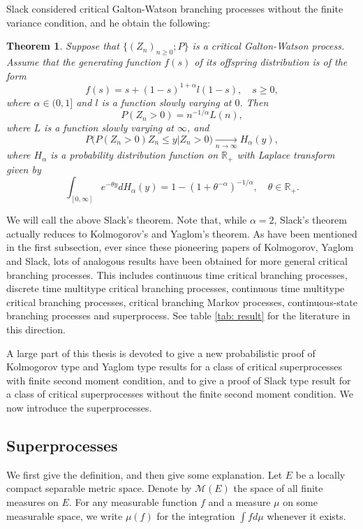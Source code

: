 \documentclass[UTF8]{pkuthss}
\theoremstyle{plain}
\newtheorem{thm}{Theorem}[section]
\theoremstyle{definition}
\numberwithin{equation}{section}
\begin{document}
	Slack \cite{Slack1968A-branching} considered critical Galton-Watson branching processes without the finite variance condition, and he obtain the following:
\begin{thm}
\label{thm: Slack result}
	Suppose that $\{(Z_n)_{n\geq 0}; P\}$ is a critical Galton-Watson process. Assume that the generating function $f(s)$ of its offspring distribution is of the form
\[
	f(s) = s + (1-s)^{1+\alpha}l(1-s),\quad s\geq 0,
\]
	where $\alpha\in (0,1]$ and $l$ is a function slowly varying at $0$.
	Then 
\[
	P(Z_n > 0) = n^{-1/\alpha} L(n),
\]
	where $L$ is a function slowly varying at $\infty$, and
\[
	P\big( P(Z_n>0)Z_n \leq y |Z_n > 0\big)\xrightarrow[n\to\infty]{} H_\alpha(y),
\]
	where $H_\alpha$ is a probability distribution function on $\mathbb R_+$ with Laplace transform given by
\[
	\int_{[0,\infty]} e^{-\theta y} dH_\alpha(y) = 1-(1+\theta^{-\alpha})^{-1/\alpha},\quad \theta \in \mathbb R_+.
\]
\end{thm}
	We will call the above Slack's theorem.
	Note that, while $\alpha = 2$, Slack's theorem actually reduces to Kolmogorov's and Yaglom's theorem. 
	As have been mentioned in the first subsection, ever since these pioneering papers of Kolmogorov, Yaglom and Slack, lots of analogous results have been obtained for more general critical branching processes.
	This includes continuous time critical branching processes, discrete time multitype critical branching processes, continuous time multitype critical branching processes, critical branching Markov processes, continuous-state branching processes and superprocess.
	See table \ref{tab: result} for the literature in this direction. 

	A large part of this thesis is devoted to give a new probabilistic proof of Kolmogorov type and Yaglom type results for a class of critical superprocesses with finite second moment condition, and to give a proof of Slack type result for a class of critical superprocesses without the finite second moment condition. 
	We now introduce the superprocesses.
\subsection{Superprocesses}
	We first give the definition, and then give some explanation.
	Let $E$ be a locally compact separable metric space. 
	Denote by $\mathcal M(E)$ the space of all finite measures on $E$. 
	For any measurable function $f$ and a measure $\mu$ on some measurable space, we write $\mu(f)$ for the integration $\int f d\mu$ whenever it exists. 
	
\end{document}
